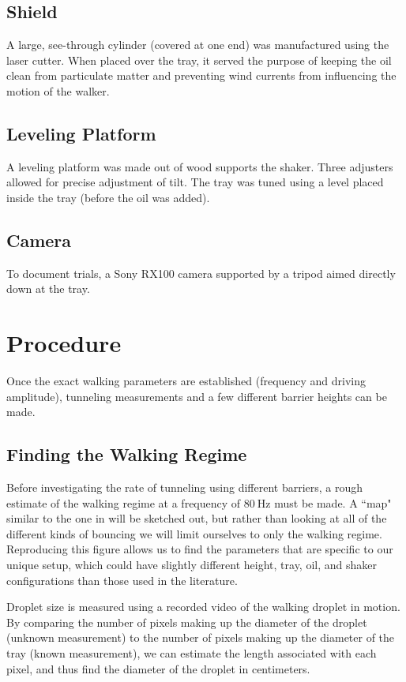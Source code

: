 \subsection{Shield}
    A large, see-through cylinder (covered at one end) was manufactured using the laser cutter. When placed over the tray, it served the purpose of keeping the oil clean from particulate matter and preventing wind currents from influencing the motion of the walker.       
   
\subsection{Leveling Platform}
    A leveling platform was made out of wood supports the shaker. Three adjusters allowed for precise adjustment of tilt. The tray was tuned using a level placed inside the tray (before the oil was added). 

\subsection{Camera}       
 
To document trials, a Sony RX100 camera supported by a tripod aimed directly down at the tray. 

\section{Procedure}
Once the exact walking parameters are established (frequency and driving amplitude), tunneling measurements and a few different barrier heights can be made. 

\subsection{Finding the Walking Regime}

Before investigating the rate of tunneling using different barriers, a rough estimate of the walking regime at a frequency of $80~\mathrm{Hz}$ must be made. A ``map" similar to the one in  will be sketched out, but rather than looking at all of the different kinds of bouncing we will limit ourselves to only the walking regime. Reproducing this figure allows us to find the parameters that are specific to our unique setup, which could have slightly different height, tray, oil, and shaker configurations than those used in the literature. 

Droplet size is measured using a recorded video of the walking droplet in motion. By comparing the number of pixels making up the diameter of the droplet (unknown measurement) to the number of pixels making up the diameter of the tray (known measurement), we can estimate the length associated with  each pixel, and thus find the diameter of the droplet in centimeters. 

